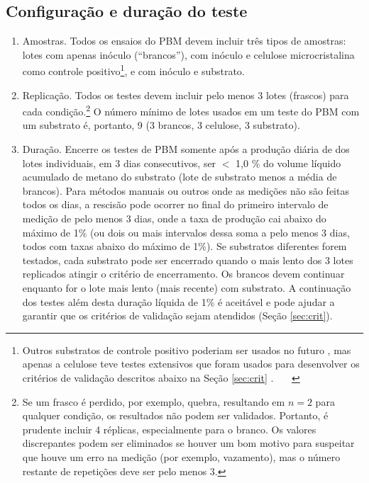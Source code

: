 \documentclass[]{article}
\begin{document}
\subsection{Configuração e duração do teste}
\label{sec:setup}
\begin{enumerate}
  \item Amostras. 
Todos os ensaios do PBM devem incluir três tipos de amostras: lotes com apenas inóculo (``brancos''), com inóculo e celulose microcristalina como controle positivo\footnote{
      Outros substratos de controle positivo poderiam ser usados no futuro \citep{kochEvaluationCommonSupermarket2020}, mas apenas a celulose teve testes extensivos que foram usados para desenvolver os critérios de validação descritos abaixo na Seção \ref{sec:crit} \citep{hafnerImprovingInterlaboratoryReproducibility2020}.
    }, e com inóculo e substrato.
  \item Replicação. 
        Todos os testes devem incluir pelo menos 3 lotes (frascos) para cada condição.\footnote{
          Se um frasco é perdido, por exemplo, quebra, resultando em $ n = 2 $ para qualquer condição, os resultados não podem ser validados.
          Portanto, é prudente incluir 4 réplicas, especialmente para o branco.
          Os valores discrepantes podem ser eliminados se houver um bom motivo para suspeitar que houve um erro na medição (por exemplo, vazamento), mas o número restante de repetições deve ser pelo menos 3.
        }
        O número mínimo de lotes usados em um teste do PBM com um substrato é, portanto, 9 (3 brancos, 3 celulose, 3 substrato).
  \item Duração. 
        Encerre os testes de PBM somente após a produção diária de  dos lotes individuais, em 3 dias consecutivos, ser $<$ 1,0 \% do volume líquido acumulado de metano do substrato (lote de substrato menos a média de brancos). 
        Para métodos manuais ou outros onde as medições não são feitas todos os dias, a rescisão pode ocorrer no final do primeiro intervalo de medição de pelo menos 3 dias, onde a taxa de produção cai abaixo do máximo de 1\% (ou dois ou mais intervalos dessa soma a pelo menos 3 dias, todos com taxas abaixo do máximo de 1\%).
        Se substratos diferentes forem testados, cada substrato pode ser encerrado quando o mais lento dos 3 lotes replicados atingir o critério de encerramento.
        Os brancos devem continuar enquanto for o lote mais lento (mais recente) com substrato.
        A continuação dos testes além desta duração líquida de 1\% é aceitável e pode ajudar a garantir que os critérios de validação sejam atendidos (Seção \ref{sec:crit}).
\end{enumerate}
\end{document}
